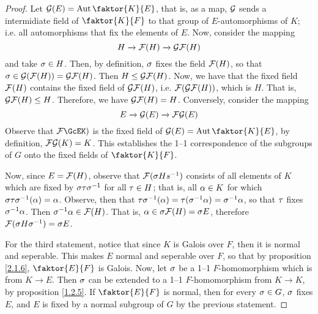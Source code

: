 \begin{proof}
    Let $\Gc(E)=\Aut{\faktor{K}{E}}$, that is, as a map, $\mathcal{G}$ sends a
    intermidiate field of  $\faktor{K}{F}$ to that group of $E$-automorphisms of
    $K$; i.e. all automorphisms that fix the elements of $E$. Now, consider the
    mapping
    \begin{equation*}
        H \xrightarrow{} \mathcal{F}(H) \xrightarrow{} \mathcal{G}\mathcal{F}(H)
    \end{equation*}
    and take $\sigma \in H$. Then, by definition, $\sigma$ fixes the field $\mathcal{F}(H)$, so
    that $\sigma \in \mathcal{G}(\mathcal{F}(H))=\mathcal{G}\mathcal{F}(H)$. Then $H \leq \mathcal{G}\mathcal{F}(H)$. Now, we have
    that the fixed field $\mathcal{F}(H)$ contains the fixed field of $\mathcal{G}\mathcal{F}(H)$,
    i.e.  $\mathcal{F}(\mathcal{G}\mathcal{F}(H))$, which is $H$. That is, $\mathcal{G}\mathcal{F}(H) \leq H$.
    Therefore, we have $\mathcal{G}\mathcal{F}(H)=H$. Conversely, consider the mapping
    \begin{equation*}
        E \xrightarrow{} \mathcal{G}(E) \xrightarrow{} \mathcal{F}\mathcal{G}(E)
    \end{equation*}
    Observe that $\Fc\GcEK)$ is the fixed field of $\Gc(E)=\Aut{\faktor{K}{E}}$,
    by definition,  $\mathcal{F}\mathcal{G}(K)=K$. This establishes the 1--1 correspondence of
    the subgroups of $G$ onto the fixed fields of $\faktor{K}{F}$.

    Now, since $E=\mathcal{F}(H)$, observe that $\mathcal{F}(\sigma{H}s^{-1})$ consists of all
    elements of $K$ which are fixed by  $\sigma\tau\sigma^{-1}$ for all $\tau \in H$; that
    is, all $\alpha \in K$ for which  $\sigma\tau\sigma^{-1}(\alpha)=\alpha$. Observe, then that
    $\tau\sigma^{-1}(\alpha)=\tau(\sigma^{-1}{\alpha})=\sigma^{-1}{\alpha}$, so that $\tau$ fixes
    $\sigma^{-1}{\alpha}$. Then $\sigma^{-1}{\alpha} \in \mathcal{F}(H)$. That is, $\alpha \in
    \sigma{\mathcal{F}(H)}=\sigma{E}$, therefore $\mathcal{F}(\sigma{H}\sigma^{-1})=\sigma{E}$.

    For the third statement, notice that since $K$ is Galois over $F$, then it
    is normal and seperable. This makes $E$ normal and seperable over $F$, so
    that by proposition \ref{2.1.6}, $\faktor{E}{F}$ is Galois. Now, let $\sigma$ be a 1--1
    $F$-homomorphism which is from  $K \xrightarrow{} E$. Then $\sigma$ can be
    extended to a 1--1 $F$-homomorphism from $K \xrightarrow{} K$, by proposition
    \ref{1.2.5}. If $\faktor{E}{F}$ is normal, then for every $\sigma \in G$,  $\sigma$
    fixes $E$, and  $E$ is fixed by a normal subgroup of $G$ by the previous
    statement.


\end{proof}
